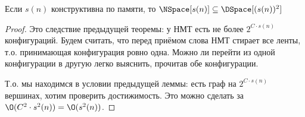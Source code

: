 	\begin{theorem}
		Если $s(n)$ конструктивна по памяти, то $\NSpace[s(n)] \subseteq \DSpace[(s(n))^2]$
	\end{theorem}
	\begin{proof}
		Это следствие предыдущей теоремы: у НМТ есть не более $2^{C \cdot s(n)}$ конфигураций.
		Будем считать, что перед приёмом слова НМТ стирает все ленты, т.о. принимающая конфигурация ровно одна.
		Можно ли перейти из одной конфигурации в другую легко выяснить, прочитав обе конфигурации.

		Т.о. мы находимся в условии предыдущей леммы: есть граф на $2^{C \cdot s(n)}$ вершинах, хотим проверить достижимость.
		Это можно сделать за $\O(C^2 \cdot s^2(n)) = \O(s^2(n))$.
	\end{proof}
